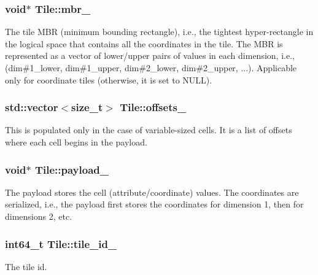 \subsubsection[{mbr\+\_\+}]{\setlength{\rightskip}{0pt plus 5cm}void$\ast$ Tile\+::mbr\+\_\+\hspace{0.3cm}{\ttfamily [private]}}\label{classTile_ab2ff00cb42ae4699447681611c1765f4}
The tile M\+B\+R (minimum bounding rectangle), i.\+e., the tightest hyper-\/rectangle in the logical space that contains all the coordinates in the tile. The M\+B\+R is represented as a vector of lower/upper pairs of values in each dimension, i.\+e., (dim\#1\+\_\+lower, dim\#1\+\_\+upper, dim\#2\+\_\+lower, dim\#2\+\_\+upper, ...). Applicable only for coordinate tiles (otherwise, it is set to N\+U\+L\+L). \hypertarget{classTile_a5cf35071b1a2f83cc2203d56c811548b}{}
\subsubsection[{offsets\+\_\+}]{\setlength{\rightskip}{0pt plus 5cm}std\+::vector$<$size\+\_\+t$>$ Tile\+::offsets\+\_\+\hspace{0.3cm}{\ttfamily [private]}}\label{classTile_a5cf35071b1a2f83cc2203d56c811548b}
This is populated only in the case of variable-\/sized cells. It is a list of offsets where each cell begins in the payload. \hypertarget{classTile_ab5aee226a2e8760db00f11b8b7ede0d2}{}
\subsubsection[{payload\+\_\+}]{\setlength{\rightskip}{0pt plus 5cm}void$\ast$ Tile\+::payload\+\_\+\hspace{0.3cm}{\ttfamily [private]}}\label{classTile_ab5aee226a2e8760db00f11b8b7ede0d2}
The payload stores the cell (attribute/coordinate) values. The coordinates are serialized, i.\+e., the payload first stores the coordinates for dimension 1, then for dimensions 2, etc. \hypertarget{classTile_a2b9e15f1229efa4a2aff16b31ee38a29}{}
\subsubsection[{tile\+\_\+id\+\_\+}]{\setlength{\rightskip}{0pt plus 5cm}int64\+\_\+t Tile\+::tile\+\_\+id\+\_\+\hspace{0.3cm}{\ttfamily [private]}}\label{classTile_a2b9e15f1229efa4a2aff16b31ee38a29}
The tile id. \hypertarget{classTile_a7a57b326881fca47f8e60434929762fb}{}
